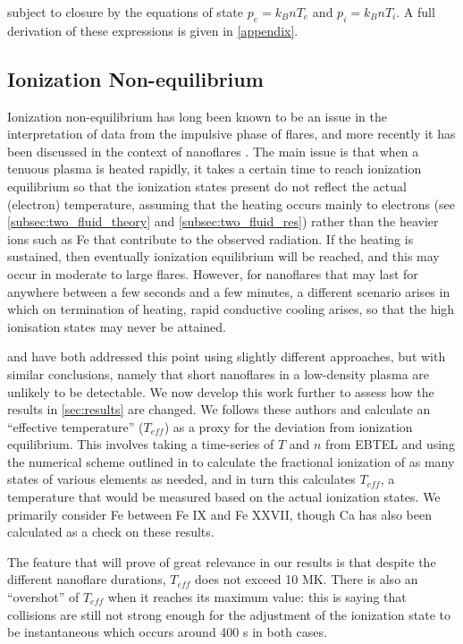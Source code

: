 \documentclass[apj]{emulateapj}
\begin{document}
	subject to closure by the equations of state $p_e=k_BnT_e$ and $p_i=k_BnT_i$. A full derivation of these expressions is given in \autoref{appendix}.
	\subsection{Ionization Non-equilibrium}
	\label{subsec:nei_theory}
	\par Ionization non-equilibrium has long been known to be an issue in the interpretation of data from the impulsive phase of flares, and more recently it has been discussed in the context of nanoflares \citep{bradshaw_explosive_2006,reale_nonequilibrium_2008}. The main issue is that when a tenuous plasma is heated rapidly, it takes a certain time to reach ionization equilibrium so that the ionization states present do not reflect the actual (electron) temperature, assuming that the heating occurs mainly to electrons (see \autoref{subsec:two_fluid_theory} and \autoref{subsec:two_fluid_res}) rather than the heavier ions such as Fe that contribute to the observed radiation. If the heating is sustained, then eventually ionization equilibrium will be reached, and this may occur in moderate to large flares. However, for nanoflares that may last for anywhere between a few seconds and a few minutes, a different scenario arises in which on termination of heating, rapid conductive cooling arises, so that the high ionisation states may never be attained.
	\par \citet{reale_nonequilibrium_2008} and \citet{bradshaw_numerical_2009} have both addressed this point using slightly different approaches, but with similar conclusions, namely that short nanoflares in a low-density plasma are unlikely to be detectable. We now develop this work further to assess how the results in \autoref{sec:results} are changed. We follows these authors and calculate an ``effective temperature'' ($T_{eff}$) as a proxy for the deviation from ionization equilibrium. This involves taking a time-series of $T$ and $n$ from EBTEL and using the numerical scheme outlined in \citet{bradshaw_numerical_2009} to calculate the fractional ionization of as many states of various elements as needed, and in turn this calculates $T_{eff}$, a temperature that would be measured based on the actual ionization states. We primarily consider Fe between Fe IX and Fe XXVII, though Ca has also been calculated as a check on these results.
	\par The feature that will prove of great relevance in our results is that despite the different nanoflare durations, $T_{eff}$ does not exceed 10 MK. There is also an ``overshot'' of $T_{eff}$ when it reaches its maximum value: this is saying that collisions are still not strong enough for the adjustment of the ionization state to be instantaneous which occurs around 400 s in both cases.
\end{document}
